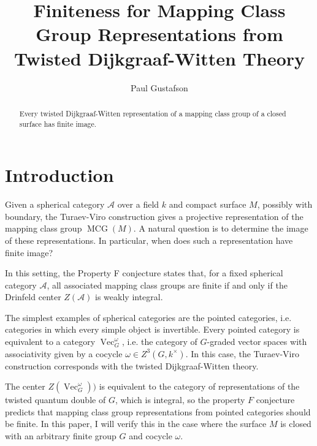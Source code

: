 \documentclass{amsart}
\DeclareMathOperator{\MCG}{MCG}
\DeclareMathOperator{\Vect}{Vec}
\begin{document}
\title{Finiteness for Mapping Class Group Representations from Twisted Dijkgraaf-Witten Theory}


\author{Paul Gustafson}
\address{Department of Mathematics,
    Texas A\&M University,
    College Station, TX
    U.S.A.}
    
\maketitle
\begin{abstract}
 Every twisted Dijkgraaf-Witten representation of a mapping class group of a closed surface has finite image.
\end{abstract}

\section{Introduction}
Given a spherical category $\mathcal A$ over a field $k$ and compact surface $M$, possibly with boundary, the Turaev-Viro construction gives a projective representation of the mapping class group $\MCG(M)$.  A natural question is to determine the image of these representations.  In particular, when does such a representation have finite image?

In this setting, the Property F conjecture \cite{nr} states that, for a fixed spherical category $\mathcal A$, all associated mapping class groups are finite if and only if the Drinfeld center $Z(\mathcal A)$ is weakly integral. 


The simplest examples of spherical categories are the pointed categories, i.e. categories in which every simple object is invertible.  Every pointed category is equivalent to a category $\Vect_G^\omega$, i.e. the category of $G$-graded vector spaces with associativity given by a cocycle $\omega \in Z^3(G, k^\times)$. In this case, the Turaev-Viro construction corresponds with the twisted Dijkgraaf-Witten theory.

The center $Z(\Vect_G^\omega))$ is equivalent to the category of representations of the twisted quantum double of $G$, which is integral, so the property $F$ conjecture predicts that mapping class group representations from pointed categories should be finite. In this paper, I will verify this in the case where the surface $M$ is closed with an arbitrary finite group $G$ and cocycle $\omega$.  
\end{document}
